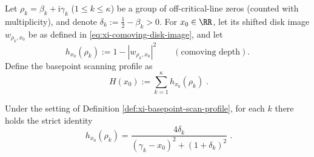\begin{definition}\label{def:xi-basepoint-scan-profile}
Let \(\rho_k=\beta_k+\mathrm{i}\gamma_k\) (\(1\le k\le\kappa\)) be a group of off-critical-line zeros (counted with multiplicity), and denote \(\delta_k:=\tfrac12-\beta_k>0\).
For \(x_0\in\RR\), let its shifted disk image \(w_{\rho_k,x_0}\) be as defined in \eqref{eq:xi-comoving-disk-image}, and let
\[
h_{x_0}(\rho_k):=1-|w_{\rho_k,x_0}|^2
\qquad(\text{comoving depth}).
\]
Define the basepoint scanning profile as
\[
\boxed{\;
H(x_0):=\sum_{k=1}^{\kappa}h_{x_0}(\rho_k)\; }.
\]
\end{definition}

\begin{proposition}\label{prop:xi-basepoint-depth-closed-form}
Under the setting of Definition \ref{def:xi-basepoint-scan-profile}, for each \(k\) there holds the strict identity
\[
\boxed{\;
h_{x_0}(\rho_k)=\frac{4\delta_k}{(\gamma_k-x_0)^2+(1+\delta_k)^2}\; }.
\]
\end{proposition}

